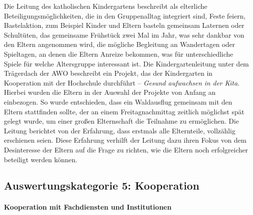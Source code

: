 Die Leitung des katholischen Kindergartens beschreibt als elterliche Beteiligungsmöglichkeiten, die in den Gruppenalltag integriert sind,  Feste feiern, Bastelaktion, zum Beispiel Kinder und Eltern basteln gemeinsam Laternen oder Schultüten, das gemeinsame Frühstück zwei Mal im Jahr, was sehr dankbar von den Eltern angenommen wird, die mögliche Begleitung an Wandertagen oder Spieltagen, an denen die Eltern Anreize bekommen, was für unterschiedliche Spiele für welche Altersgruppe interessant ist.  
Die Kindergartenleitung unter dem Trägerdach der AWO beschreibt ein Projekt, das der Kindergarten in Kooperation mit der Hochschule durchführt -- \emph{Gesund aufwachsen in der Kita}. Hierbei wurden die Eltern in der Auswahl der Projekte von Anfang an einbezogen. So wurde entschieden, dass ein Waldausflug gemeinsam mit den Eltern stattfinden sollte, der an einem Freitagnachmittag zeitlich möglichst spät gelegt wurde, um einer großen Elternschaft die Teilnahme zu ermöglichen. Die Leitung berichtet von der Erfahrung, dass erstmals alle Elternteile, vollzählig erschienen seien. Diese Erfahrung verhilft der Leitung dazu ihren Fokus von dem Desinteresse der Eltern auf die Frage zu richten, wie die Eltern noch erfolgreicher beteiligt werden können.  

\subsection{Auswertungskategorie 5: Kooperation}

\paragraph{Kooperation mit Fachdiensten und Institutionen}

